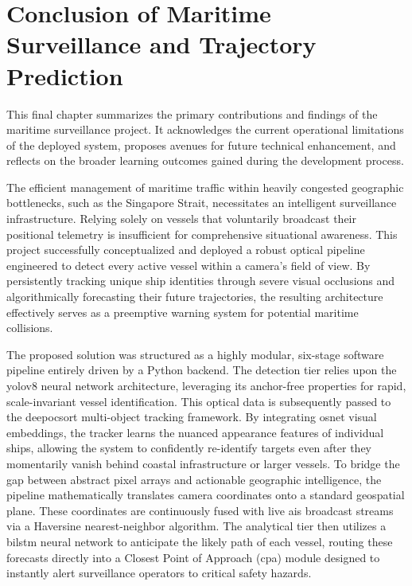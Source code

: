 \chapter{Conclusion of Maritime Surveillance and Trajectory Prediction}

This final chapter summarizes the primary contributions and findings of the maritime surveillance project. It acknowledges the current operational limitations of the deployed system, proposes avenues for future technical enhancement, and reflects on the broader learning outcomes gained during the development process.


The efficient management of maritime traffic within heavily congested geographic bottlenecks, such as the Singapore Strait, necessitates an intelligent surveillance infrastructure. Relying solely on vessels that voluntarily broadcast their positional telemetry is insufficient for comprehensive situational awareness. This project successfully conceptualized and deployed a robust optical pipeline engineered to detect every active vessel within a camera's field of view. By persistently tracking unique ship identities through severe visual occlusions and algorithmically forecasting their future trajectories, the resulting architecture effectively serves as a preemptive warning system for potential maritime collisions.

The proposed solution was structured as a highly modular, six-stage software pipeline entirely driven by a Python backend. The detection tier relies upon the \gls{yolov8} neural network architecture, leveraging its anchor-free properties for rapid, scale-invariant vessel identification. This optical data is subsequently passed to the \gls{deepocsort} multi-object tracking framework. By integrating \gls{osnet} visual embeddings, the tracker learns the nuanced appearance features of individual ships, allowing the system to confidently re-identify targets even after they momentarily vanish behind coastal infrastructure or larger vessels. To bridge the gap between abstract pixel arrays and actionable geographic intelligence, the pipeline mathematically translates camera coordinates onto a standard geospatial plane. These coordinates are continuously fused with live \gls{ais} broadcast streams via a Haversine nearest-neighbor algorithm. The analytical tier then utilizes a \gls{bilstm} neural network to anticipate the likely path of each vessel, routing these forecasts directly into a Closest Point of Approach (\gls{cpa}) module designed to instantly alert surveillance operators to critical safety hazards.

